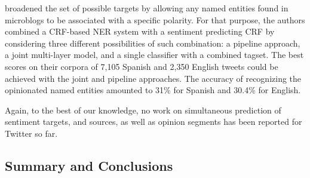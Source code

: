 
\citet{Mitchell:13} broadened the set of possible targets by allowing
any named entities found in microblogs to be associated with a
specific polarity.  For that purpose, the authors combined a CRF-based
NER system with a sentiment predicting CRF by considering three
different possibilities of such combination: a pipeline approach, a
joint multi-layer model, and a single classifier with a combined
tagset.  The best scores on their corpora of 7,105 Spanish and 2,350
English tweets could be achieved with the joint and pipeline
approaches.  The accuracy of recognizing the opinionated named
entities amounted to 31\% for Spanish and 30.4\% for English.




Again, to the best of our knowledge, no work on simultaneous
prediction of sentiment targets, and sources, as well as opinion
segments has been reported for Twitter so far.


\subsection{Summary and Conclusions}\label{slsa:subsec:conclusions}
